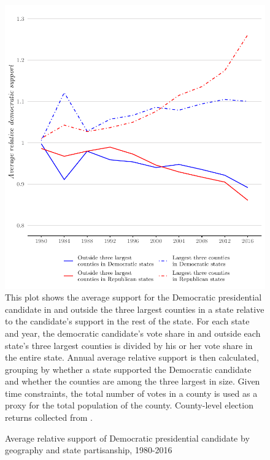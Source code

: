 \documentclass[12pt]{article}
\begin{document}
\begin{figure}[!ht]
\caption{Average relative support of Democratic presidential candidate by geography and state partisanship, 1980-2016}
\label{fig:ideology}
\centering
\includegraphics[width=.75\textwidth]{plots/county_support}
\newline\scriptsize{This plot shows the average support for the Democratic presidential candidate in and outside the three largest counties in a state relative to the candidate's support in the rest of the state. For each state and year, the democratic candidate's vote share in and outside each state's three largest counties is divided by his or her vote share in the entire state. Annual average relative support is then calculated, grouping by whether a state supported the Democratic candidate and whether the counties are among the three largest in size. Given time constraints, the total number of votes in a county is used as a proxy for the total population of the county. County-level election returns collected from \textcite{cqpressCQVotingElections2019}.}
\end{figure}
\end{document}

